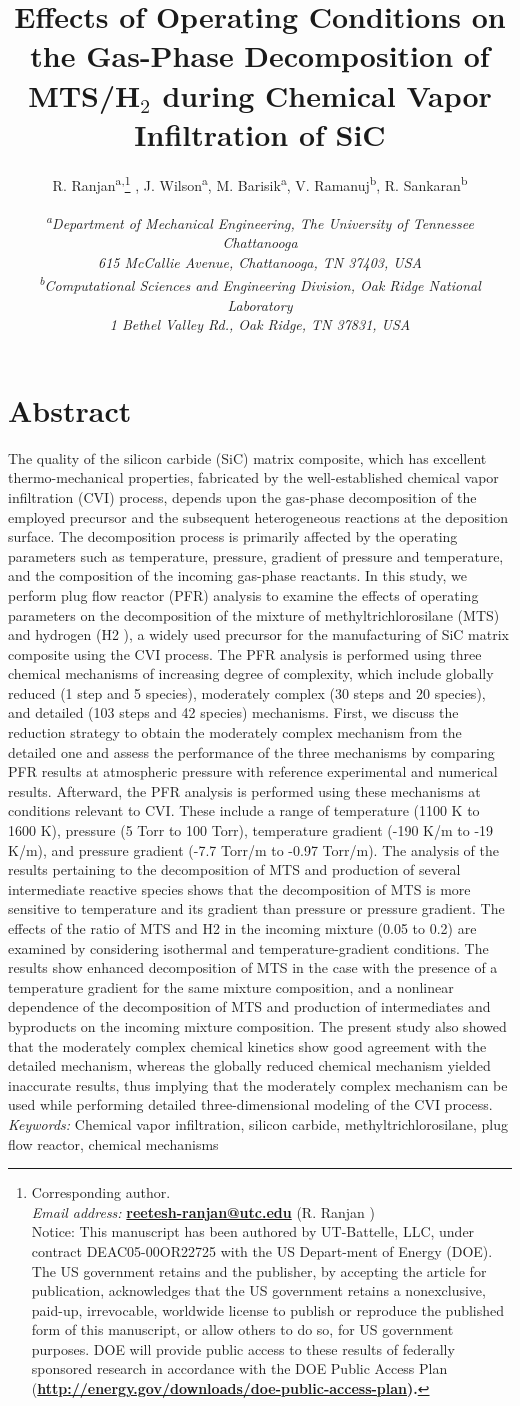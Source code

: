 \documentclass[10pt, letterpaper]{article}
\title{
    \vspace{-40.5px}
    \Large 
        Effects of Operating Conditions on the Gas-Phase Decomposition of \\
        MTS/H$_2$ during Chemical Vapor Infiltration of SiC
    }
\author{
    {\normalsize
        R. Ranjan\textsuperscript{a,}\thanks{\footnotesize Corresponding author. \\ 
        \hspace*{12.5pt} \emph{Email address:} \textbf{\href{mailto:reetesh-ranjan@utc.edu}{reetesh-ranjan@utc.edu}} (R. Ranjan ) \\
        \hspace*{13pt} Notice: This manuscript has been authored by UT-Battelle, LLC, under contract DEAC05-00OR22725 with the US Depart-ment of Energy (DOE). The US government retains and the publisher, by accepting the article for publication, acknowledges that the US government retains a nonexclusive, paid-up, irrevocable, worldwide license to publish or reproduce the published form of this manuscript, or allow others to do so, for US government purposes. DOE will provide public access to these results of federally sponsored research in accordance with the DOE Public Access Plan (\bf \href{http://energy.gov/downloads/doe-public-access-plan}{http://energy.gov/downloads/doe-public-access-plan}).
} ,
        J. Wilson\textsuperscript{a},
        M. Barisik\textsuperscript{a},
        V. Ramanuj\textsuperscript{b},
        R. Sankaran\textsuperscript{b}
        }
    }
\date{
    \footnotesize 
        \emph{
            \textsuperscript{a}Department of Mechanical Engineering, The University of Tennessee Chattanooga \\
            615 McCallie Avenue, Chattanooga, TN 37403, USA \\
            \textsuperscript{b}Computational Sciences and Engineering Division, Oak Ridge National Laboratory \\
            1 Bethel Valley Rd., Oak Ridge, TN 37831, USA \\
        }
    }
\begin{document}
\maketitle
\noindent\hrulefill%
\vspace{-0.125in}
\section*{Abstract}
The quality of the silicon carbide (SiC) matrix composite, which has excellent thermo-mechanical properties,
fabricated by the well-established chemical vapor infiltration (CVI) process, depends upon the gas-phase
decomposition of the employed precursor and the subsequent heterogeneous reactions at the deposition
surface. The decomposition process is primarily affected by the operating parameters such as temperature,
pressure, gradient of pressure and temperature, and the composition of the incoming gas-phase reactants. In
this study, we perform plug flow reactor (PFR) analysis to examine the effects of operating parameters on the
decomposition of the mixture of methyltrichlorosilane (MTS) and hydrogen (H2 ), a widely used precursor
for the manufacturing of SiC matrix composite using the CVI process. The PFR analysis is performed using
three chemical mechanisms of increasing degree of complexity, which include globally reduced (1 step and 5
species), moderately complex (30 steps and 20 species), and detailed (103 steps and 42 species) mechanisms.
First, we discuss the reduction strategy to obtain the moderately complex mechanism from the detailed
one and assess the performance of the three mechanisms by comparing PFR results at atmospheric pressure
with reference experimental and numerical results. Afterward, the PFR analysis is performed using these
mechanisms at conditions relevant to CVI. These include a range of temperature (1100 K to 1600 K), pressure
(5 Torr to 100 Torr), temperature gradient (-190 K/m to -19 K/m), and pressure gradient (-7.7 Torr/m to
-0.97 Torr/m). The analysis of the results pertaining to the decomposition of MTS and production of several
intermediate reactive species shows that the decomposition of MTS is more sensitive to temperature and
its gradient than pressure or pressure gradient. The effects of the ratio of MTS and H2 in the incoming
mixture (0.05 to 0.2) are examined by considering isothermal and temperature-gradient conditions. The
results show enhanced decomposition of MTS in the case with the presence of a temperature gradient for
the same mixture composition, and a nonlinear dependence of the decomposition of MTS and production
of intermediates and byproducts on the incoming mixture composition. The present study also showed that
the moderately complex chemical kinetics show good agreement with the detailed mechanism, whereas the
globally reduced chemical mechanism yielded inaccurate results, thus implying that the moderately complex
mechanism can be used while performing detailed three-dimensional modeling of the CVI process.
\vspace{6pt}
\\
\emph{Keywords:} Chemical vapor infiltration, silicon carbide, methyltrichlorosilane, plug flow reactor, chemical mechanisms
\end{document}
